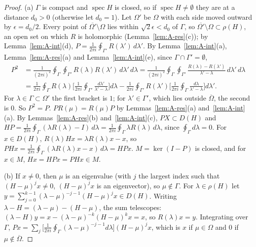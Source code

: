 \documentclass[11pt]{article}
\theoremstyle{definition}
\newcommand{\spec}{\operatorname{spec}}
\begin{document}
\begin{proof}
(a) $\Gamma$ is compact and $\spec H$ is closed, so if $\spec H \ne \emptyset$ they are at a distance $d_0 > 0$ (otherwise let $d_0 = 1$). Let $\Omega'$ be $\Omega$ with each side moved outward by $\epsilon = d_0/2$. Every point of $\overline{\Omega'}\setminus\Omega$ lies within $\sqrt2\epsilon < d_0$ of $\Gamma$, so $\overline{\Omega'}\setminus\Omega \subset \rho(H)$, an open set on which $R$ is holomorphic (Lemma~\ref{lem:A-res}(c)); by Lemma~\ref{lem:A-int}(d), $P = \frac{1}{2\pi i}\oint_{\Gamma'}R(\lambda')\,d\lambda'$. By Lemma~\ref{lem:A-int}(a), Lemma~\ref{lem:A-res}(a) and Lemma~\ref{lem:A-int}(e), since $\Gamma \cap \Gamma' = \emptyset$,
\begin{align*}
P^2 &= \frac{1}{(2\pi i)^2}\oint_\Gamma\oint_{\Gamma'}R(\lambda)R(\lambda')\,d\lambda'\,d\lambda = \frac{1}{(2\pi i)^2}\oint_\Gamma\oint_{\Gamma'}\frac{R(\lambda) - R(\lambda')}{\lambda' - \lambda}\,d\lambda'\,d\lambda\\
&= \frac{1}{2\pi i}\oint_\Gamma R(\lambda)\Big[\frac{1}{2\pi i}\oint_{\Gamma'}\frac{d\lambda'}{\lambda' - \lambda}\Big]d\lambda - \frac{1}{2\pi i}\oint_{\Gamma'}R(\lambda')\Big[\frac{1}{2\pi i}\oint_\Gamma\frac{d\lambda}{\lambda' - \lambda}\Big]d\lambda'.
\end{align*}
For $\lambda \in \Gamma \subset \Omega'$ the first bracket is $1$; for $\lambda' \in \Gamma'$, which lies outside $\overline\Omega$, the second is $0$. So $P^2 = P$. $PR(\mu) = R(\mu)P$ by Lemmas~\ref{lem:A-res}(a) and~\ref{lem:A-int}(a). By Lemmas~\ref{lem:A-res}(b) and~\ref{lem:A-int}(c), $PX \subset D(H)$ and $HP = \frac{1}{2\pi i}\oint_\Gamma(\lambda R(\lambda) - I)\,d\lambda = \frac{1}{2\pi i}\oint_\Gamma\lambda R(\lambda)\,d\lambda$, since $\oint_\Gamma d\lambda = 0$. For $x \in D(H)$, $R(\lambda)Hx = \lambda R(\lambda)x - x$, so $PHx = \frac{1}{2\pi i}\oint_\Gamma(\lambda R(\lambda)x - x)\,d\lambda = HPx$. $M = \ker(I - P)$ is closed, and for $x \in M$, $Hx = HPx = PHx \in M$.

(b) If $x \ne 0$, then $\mu$ is an eigenvalue (with $j$ the largest index such that $(H - \mu)^jx \ne 0$, $(H - \mu)^jx$ is an eigenvector), so $\mu \notin \Gamma$. For $\lambda \in \rho(H)$ let $y = \sum_{j=0}^{k-1}(\lambda - \mu)^{-j-1}(H - \mu)^jx \in D(H)$. Writing $\lambda - H = (\lambda - \mu) - (H - \mu)$, the sum telescopes: $(\lambda - H)y = x - (\lambda - \mu)^{-k}(H - \mu)^kx = x$, so $R(\lambda)x = y$. Integrating over $\Gamma$, $Px = \sum_j\big[\frac{1}{2\pi i}\oint_\Gamma(\lambda - \mu)^{-j-1}d\lambda\big](H - \mu)^jx$, which is $x$ if $\mu \in \Omega$ and $0$ if $\mu \notin \overline\Omega$.


\end{proof}
\end{document}
